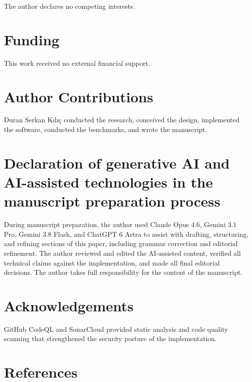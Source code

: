 \documentclass[fleqn,10pt]{wlpeerj}
\begin{document}
The author declares no competing interests.

\section*{Funding}\label{funding}

This work received no external financial support.

\section*{Author Contributions}\label{author-contributions}

Duran Serkan Kılıç conducted the research, conceived the design,
implemented the software, conducted the benchmarks, and wrote the
manuscript.

\section*{Declaration of generative AI and AI-assisted technologies in
the manuscript preparation
process}\label{declaration-of-generative-ai-and-ai-assisted-technologies-in-the-manuscript-preparation-process}

During manuscript preparation, the author used Claude Opus 4.6, Gemini
3.1 Pro, Gemini 3.8 Flash, and ChatGPT 6 Astra to assist with drafting,
structuring, and refining sections of this paper, including grammar
correction and editorial refinement. The author reviewed and edited the
AI-assisted content, verified all technical claims against the
implementation, and made all final editorial decisions. The author takes
full responsibility for the content of the manuscript.

\section*{Acknowledgements}\label{acknowledgements}

GitHub CodeQL and SonarCloud provided static analysis and code quality
scanning that strengthened the security posture of the implementation.

\newpage

\section*{References}\label{references}
\end{document}
